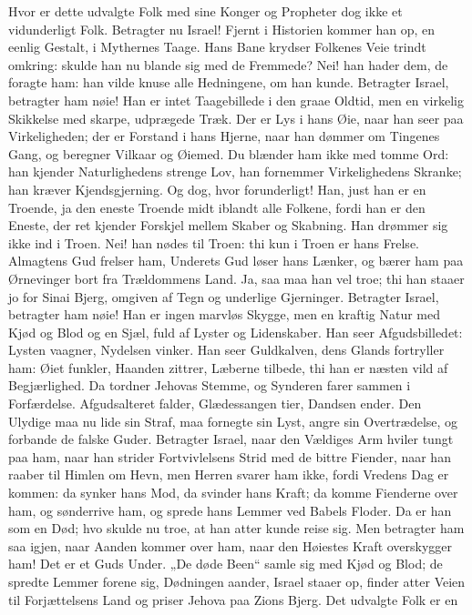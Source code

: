 \documentclass[12pt,a4paper]{book}
\begin{document}
Hvor er dette udvalgte Folk med sine Konger og Propheter dog ikke et
vidunderligt Folk. Betragter nu Israel! Fjernt i
Historien kommer han op, en eenlig Gestalt, i Mythernes Taage. Hans Bane krydser
Folkenes Veie trindt omkring: skulde han nu blande sig med de Fremmede? Nei! han
hader dem, de foragte ham: han vilde knuse alle Hedningene, om han kunde.
Betragter Israel, betragter ham nøie! Han er intet Taagebillede i den graae
Oldtid, men en virkelig Skikkelse med skarpe, udprægede Træk. Der er Lys i hans
Øie, naar han seer paa Virkeligheden; der er Forstand i hans Hjerne, naar han
dømmer om Tingenes Gang, og beregner Vilkaar og Øiemed. Du blænder ham ikke med
tomme Ord: han kjender Naturlighedens strenge Lov, han fornemmer Virkelighedens
Skranke; han kræver Kjendsgjerning. Og dog, hvor forunderligt! Han, just han er
en Troende, ja den eneste Troende midt iblandt alle Folkene, fordi han er den
Eneste, der ret kjender Forskjel mellem Skaber og Skabning. Han drømmer sig ikke
ind i Troen. Nei! han nødes til Troen: thi kun i Troen er hans Frelse. Almagtens
Gud frelser ham, Underets Gud løser hans Lænker, og bærer ham paa Ørnevinger
bort fra Trældommens Land. Ja, saa maa han vel troe; thi han staaer jo for Sinai
Bjerg, omgiven af Tegn og underlige Gjerninger. Betragter Israel, betragter ham
nøie! Han er ingen marvløs Skygge, men en kraftig Natur med Kjød og Blod og en
Sjæl, fuld af Lyster og Lidenskaber. Han seer Afgudsbilledet: Lysten vaagner,
Nydelsen vinker. Han seer Guldkalven, dens Glands fortryller ham: Øiet funkler,
Haanden zittrer, Læberne tilbede, thi han er næsten vild af Begjærlighed. Da
tordner Jehovas Stemme, og Synderen farer sammen i Forfærdelse. Afgudsalteret
falder, Glædessangen tier, Dandsen ender. Den Ulydige maa nu lide sin Straf, maa
fornegte sin Lyst, angre sin Overtrædelse, og forbande de falske Guder.
Betragter Israel, naar den Vældiges Arm hviler tungt paa ham, naar han strider
Fortvivlelsens Strid med de bittre Fiender, naar
han raaber til Himlen om Hevn, men Herren svarer ham ikke, fordi Vredens Dag er
kommen: da synker hans Mod, da svinder hans Kraft; da komme Fienderne over ham,
og sønderrive ham, og sprede hans Lemmer ved Babels Floder. Da er han som en
Død; hvo skulde nu troe, at han atter kunde reise sig. Men betragter ham saa
igjen, naar Aanden kommer over ham, naar den Høiestes Kraft overskygger ham! Det
er et Guds Under. „De døde Been“ samle sig med Kjød og Blod; de spredte Lemmer
forene sig, Dødningen aander, Israel staaer op, finder atter Veien til
Forjættelsens Land og priser Jehova paa Zions Bjerg. Det udvalgte Folk er en
\end{document}

